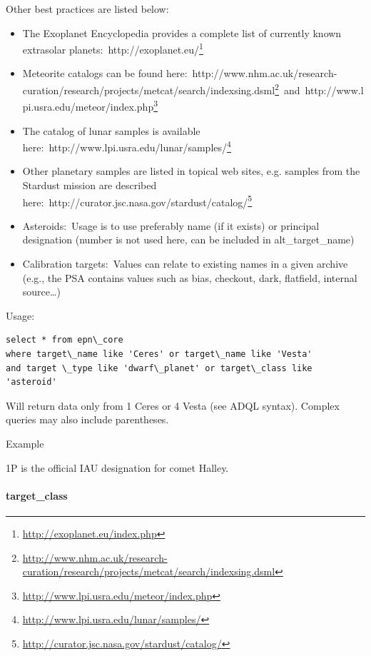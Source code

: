 \documentclass[11pt,a4paper]{ivoa}
\begin{document}
Other best practices are listed below:

\begin{itemize}
\item The Exoplanet Encyclopedia provides a complete list of currently known extrasolar planets: http://exoplanet.eu/\footnote{\url{http://exoplanet.eu/index.php}}
\item Meteorite catalogs can be found here: http://www.nhm.ac.uk/research-curation/research/projects/metcat/search/indexsing.dsml\footnote{\url{http://www.nhm.ac.uk/research-curation/research/projects/metcat/search/indexsing.dsml}} and http://www.lpi.usra.edu/meteor/index.php\footnote{\url{http://www.lpi.usra.edu/meteor/index.php}}
\item The catalog of lunar samples is available here: http://www.lpi.usra.edu/lunar/samples/\footnote{\url{http://www.lpi.usra.edu/lunar/samples/}}
\item Other planetary samples are listed in topical web sites, e.g. samples from the Stardust mission are described here: http://curator.jsc.nasa.gov/stardust/catalog/\footnote{\url{http://curator.jsc.nasa.gov/stardust/catalog/}}
\item Asteroids: Usage is to use preferably name (if it exists) or principal designation (number is not used here, can be included in alt\_target\_name)
\item Calibration targets: Values can relate to existing names in a given archive (e.g., the PSA contains values such as bias, checkout, dark, flatfield, internal source…)
\end{itemize}

Usage:






\begin{verbatim}select * from epn\_core 
where target\_name like 'Ceres' or target\_name like 'Vesta' 
and target \_type like 'dwarf\_planet' or target\_class like 'asteroid'\end{verbatim}




Will return data only from 1 Ceres or 4 Vesta (see ADQL syntax). Complex queries may also include parentheses.

Example

1P is the official IAU designation for comet Halley.

\paragraph{target\_class}
\end{document}
